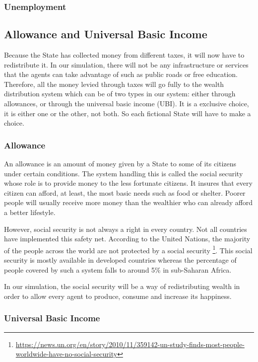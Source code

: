     \subsubsection{Unemployment}


\subsection{Allowance and Universal Basic Income}

Because the State has collected money from different taxes, it will now have to redistribute it. In our simulation, there will not be any infrastructure or services that the agents can take advantage of such as public roads or free education. Therefore, all the money levied through taxes will go fully to the wealth distribution system which can be of two types in our system: either through allowances, or through the universal basic income (UBI). It is a exclusive choice, it is either one or the other, not both. So each fictional State will have to make a choice.

    \subsubsection{Allowance}
    
    An allowance is an amount of money given by a State to some of its citizens under certain conditions. The system handling this is called the social security whose role is to provide money to the less fortunate citizens. It insures that every citizen can afford, at least, the most basic needs such as food or shelter. Poorer people will usually receive more money than the wealthier who can already afford a better lifestyle.
    
    However, social security is not always a right in every country. Not all countries have implemented this safety net. According to the United Nations, the majority of the people across the world are not protected by a social security \footnote{\url{https://news.un.org/en/story/2010/11/359142-un-study-finds-most-people-worldwide-have-no-social-security}}. This social security is mostly available in developed countries whereas the percentage of people covered by such a system falls to around 5\% in sub-Saharan Africa.
    
    In our simulation, the social security will be a way of redistributing wealth in order to allow every agent to produce, consume and increase its happiness.
    
    \subsubsection{Universal Basic Income}
    

